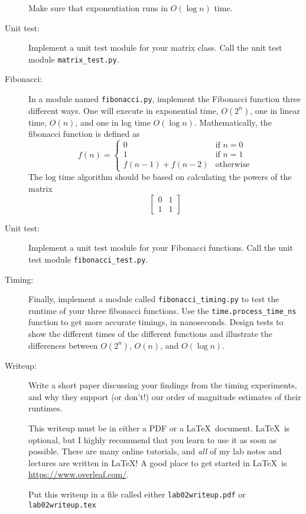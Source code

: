 \documentclass{article}
\begin{document}
\begin{description}
Make sure that exponentiation runs in $O(\log n)$ time.

\item[Unit test:]  Implement a unit test module for your matrix class. Call
the unit test module \lstinline{matrix_test.py}.

\item[Fibonacci:]  In a module named \lstinline{fibonacci.py},
implement the Fibonacci function three different ways.  One will
execute in exponential time, $O(2^n)$, one in linear time, $O(n)$, and one in log time
$O(\log n)$.
Mathematically, the fibonacci function is 
defined as 
\[
f(n) = \left\{\begin{array}{ll}
     0 & \mbox{if } n = 0\\
       1 & \mbox{if } n = 1\\
       f(n-1) + f(n-2) & \mbox{otherwise}\end{array}\right.
 \]
 The log time algorithm should be based on calculating
 the powers of the matrix
 \[
 \left[\begin{array}{cc}0 & 1 \\ 1 & 1 \end{array}\right]
 \]
 
 \item[Unit test:] Implement a unit test module for your
 Fibonacci functions.  Call the unit test module \lstinline{fibonacci_test.py}.
 
 \item[Timing:] Finally, implement a module called \lstinline{fibonacci_timing.py}
 to test the runtime
 of your three fibonacci functions.  Use the \lstinline{time.process_time_ns}
 function to get more accurate timings, in nanoseconds.  Design
 tests to show the different times of the different functions and illustrate
 the differences between $O(2^n)$, $O(n)$, and $O(\log n)$.
 
 \item[Writeup:]  Write a short paper discussing your findings from the
 timing experiments, and why they support (or don't!) our order of
 magnitude estimates of their runtimes. 
 
 This writeup must be in either a PDF or a \LaTeX\ document.
 \LaTeX\ is optional, but I highly recommend that you learn to use
 it as soon as possible.  There are many online tutorials, and {\em all}
 of my lab notes and lectures are written in \LaTeX!  A good place to
 get started in \LaTeX\ is \url{https://www.overleaf.com/}.
 
 Put this writeup in a file
 called either {\tt lab02writeup.pdf}
 or  {\tt lab02writeup.tex}
 

\end{description}
\end{document}
